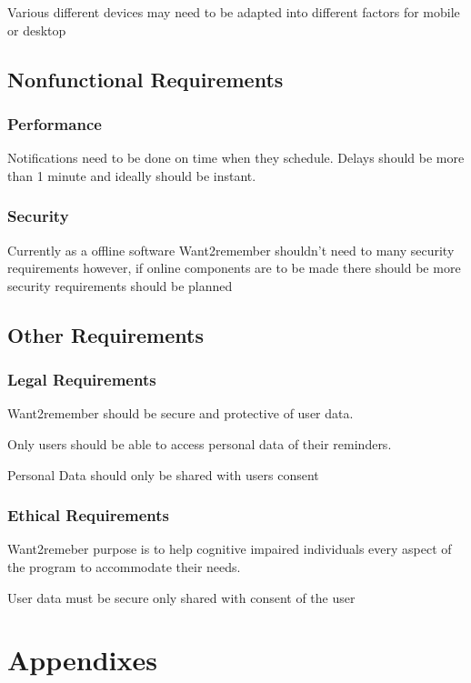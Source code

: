 \documentclass[
]{article}
\begin{document}
Various different devices may need to be adapted into different factors
for mobile or desktop

\subsection{Nonfunctional
Requirements}\label{nonfunctional-requirements}

\subsubsection{Performance}\label{performance}

Notifications need to be done on time when they schedule. Delays should
be more than 1 minute and ideally should be instant.

\subsubsection{Security}\label{security}

Currently as a offline software Want2remember shouldn't need to many
security requirements however, if online components are to be made there
should be more security requirements should be planned

\subsection{Other Requirements}\label{other-requirements}

\subsubsection{Legal Requirements}\label{legal-requirements}

Want2remember should be secure and protective of user data.

Only users should be able to access personal data of their reminders.

Personal Data should only be shared with users consent

\subsubsection{Ethical Requirements}\label{ethical-requirements}

Want2remeber purpose is to help cognitive impaired individuals every
aspect of the program to accommodate their needs.

User data must be secure only shared with consent of the user

\section{Appendixes}\label{appendixes}
\end{document}
